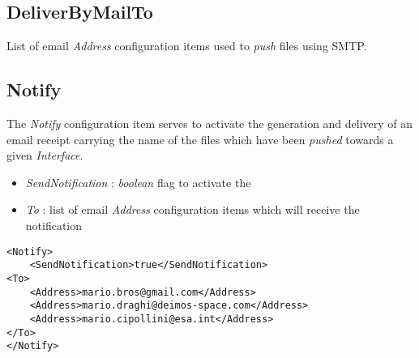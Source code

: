 \documentclass[dec_sum_main.tex]{subfiles}
\begin{document}
\subsection{DeliverByMailTo}
List of email \textit{Address} configuration items used to \textit{push} files using SMTP.

\subsection{Notify}
The \textit{Notify} configuration item serves to activate the generation and delivery of an email receipt carrying the name of the files which have been \textit{pushed} towards a given \textit{Interface}.
\begin{itemize}
	\item \textit{SendNotification} : \textit{boolean} flag to activate the 
	\item \textit{To} : list of email \textit{Address} configuration items which will receive the notification
\end{itemize}

\begin{lstlisting}
<Notify>
	<SendNotification>true</SendNotification>
<To>
	<Address>mario.bros@gmail.com</Address>
	<Address>mario.draghi@deimos-space.com</Address>
	<Address>mario.cipollini@esa.int</Address>
</To>
</Notify>
\end{lstlisting}
\end{document}

